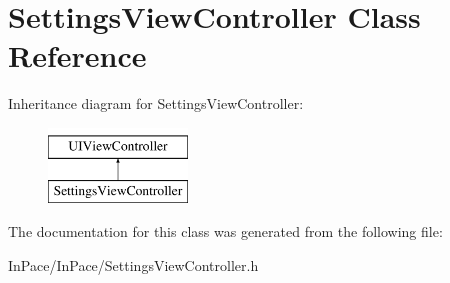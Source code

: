 \hypertarget{interfaceSettingsViewController}{\section{Settings\-View\-Controller Class Reference}
\label{interfaceSettingsViewController}
}
Inheritance diagram for Settings\-View\-Controller\-:\begin{figure}[H]
\begin{center}
\leavevmode
\includegraphics[height=2.000000cm]{interfaceSettingsViewController}
\end{center}
\end{figure}


The documentation for this class was generated from the following file\-:\begin{DoxyCompactItemize}
\item 
In\-Pace/\-In\-Pace/Settings\-View\-Controller.\-h\end{DoxyCompactItemize}
